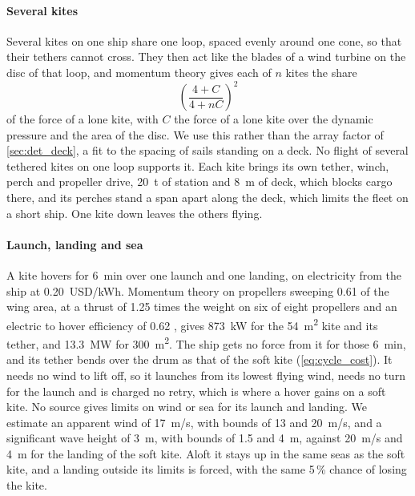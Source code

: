 \paragraph{Several kites} Several kites on one ship share one loop, spaced evenly around one cone, so that their tethers cannot cross. They then act like the blades of a wind turbine on the disc of that loop, and momentum theory gives each of $n$ kites the share
\begin{equation}
\left(\frac{4+C}{4+nC}\right)^2
\label{eq:loop_share}
\end{equation}
of the force of a lone kite, with $C$ the force of a lone kite over the dynamic pressure and the area of the disc. We use this rather than the array factor of \cref{sec:det_deck}, a fit to the spacing of sails standing on a deck. No flight of several tethered kites on one loop supports it. Each kite brings its own tether, winch, perch and propeller drive, \SI{20}{t} of station and \SI{8}{m} of deck, which blocks cargo there, and its perches stand a span apart along the deck, which limits the fleet on a short ship. One kite down leaves the others flying.

\paragraph{Launch, landing and sea} A kite hovers for \SI{6}{min} over one launch and one landing, on electricity from the ship at \SI{0.20}{USD/kWh}. Momentum theory on propellers sweeping 0.61 of the wing area, at a thrust of 1.25 times the weight on six of eight propellers \citep{echeverri2020part1} and an electric to hover efficiency of 0.62 \citep{echeverri2020part1,makani2020code}, gives \SI{873}{kW} for the \SI{54}{m^2} kite and its tether, and \SI{13.3}{MW} for \SI{300}{m^2}. The ship gets no force from it for those \SI{6}{min}, and its tether bends over the drum as that of the soft kite (\cref{eq:cycle_cost}). It needs no wind to lift off, so it launches from its lowest flying wind, needs no turn for the launch and is charged no retry, which is where a hover gains on a soft kite. No source gives limits on wind or sea for its launch and landing. We estimate an apparent wind of \SI{17}{m/s}, with bounds of 13 and \SI{20}{m/s}, and a significant wave height of \SI{3}{m}, with bounds of 1.5 and \SI{4}{m}, against \SI{20}{m/s} and \SI{4}{m} for the landing of the soft kite. Aloft it stays up in the same seas as the soft kite, and a landing outside its limits is forced, with the same 5\,\% chance of losing the kite.

